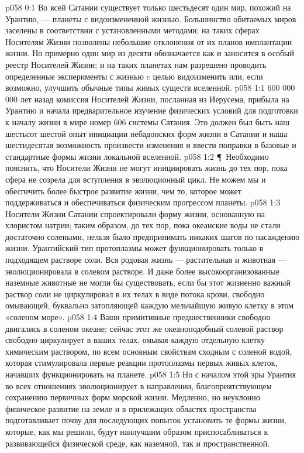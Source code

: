 \author{Носитель Жизни}
\vs p058 0:1 Во всей Сатании существует только шестьдесят один мир, похожий на Урантию, --- планеты с видоизмененной жизнью. Большинство обитаемых миров заселены в соответствии с установленными методами; на таких сферах Носителям Жизни позволены небольшие отклонения от их планов имплантации жизни. Но примерно один мир из десяти обозначается как  и заносится в особый реестр Носителей Жизни; и на таких планетах нам разрешено проводить определенные эксперименты с жизнью c целью видоизменить или, если возможно, улучшить обычные типы живых существ вселенной.
\vs p058 1:1 600 000 000 лет назад комиссия Носителей Жизни, посланная из Иерусема, прибыла на Урантию и начала предварительное изучение физических условий для подготовки к началу жизни в мире номер 606 системы Сатания. Это должен был быть наш шестьсот шестой опыт инициации небадонских форм жизни в Сатании и наша шестидесятая возможность произвести изменения и ввести поправки в базовые и стандартные формы жизни локальной вселенной.
\vs p058 1:2 \P\ Необходимо пояснить, что Носители Жизни не могут инициировать жизнь до тех пор, пока сфера не созрела для вступления в эволюционный цикл. Не можем мы и обеспечить более быстрое развитие жизни, чем то, которое может поддерживаться и обеспечиваться физическим прогрессом планеты.
\vs p058 1:3 Носители Жизни Сатании спроектировали форму жизни, основанную на хлористом натрии; таким образом, до тех пор, пока океанские воды не стали достаточно солеными, нельзя было предпринимать никаких шагов по насаждению жизни. Урантийский тип протоплазмы может функционировать только в подходящем растворе соли. Вся родовая жизнь --- растительная и животная --- эволюционировала в солевом растворе. И даже более высокоорганизованные наземные животные не могли бы существовать, если бы этот жизненно важный раствор соли не циркулировал в их телах в виде потока крови, свободно омывающей, буквально затопляющей каждую мельчайшую живую клетку в этом «соленом море».
\vs p058 1:4 Ваши примитивные предшественники свободно двигались в соленом океане; сейчас этот же океаноподобный солевой раствор свободно циркулирует в ваших телах, омывая каждую отдельную клетку химическим раствором, по всем основным свойствам сходным с соленой водой, которая стимулировала первые реакции протоплазмы первых живых клеток, начавших функционировать на планете.
\vs p058 1:5 Но с началом этой эры Урантия во всех отношениях эволюционирует в направлении, благоприятствующем сохранению первичных форм морской жизни. Медленно, но неуклонно физическое развитие на земле и в прилежащих областях пространства подготавливает почву для последующих попыток установить те формы жизни, которые, как мы решили, будут наилучшим образом приспосабливаться к развивающейся физической среде, как наземной, так и пространственной.
